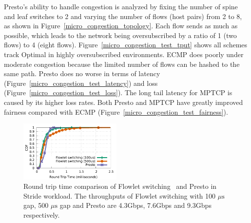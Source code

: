 Presto's ability to handle congestion is analyzed by fixing 
the number of spine and leaf switches to 2 and varying
the number of flows (host pairs) from 2 to 8, as shown
in Figure~\ref{micro_congestion_topology}. 
Each flow sends as much as possible, which leads to the network
being oversubscribed by a ratio of 1 (two flows) to 4 (eight flows).
Figure~\ref{micro_congestion_test_tput} shows all schemes track Optimal in highly
oversubscribed environments. ECMP
does poorly under moderate congestion because the limited number of flows can be hashed to the same path.
Presto does no worse in terms of latency (Figure~\ref{micro_congestion_test_latency}) and loss (Figure~\ref{micro_congestion_test_loss}).
The long tail latency for MPTCP is caused by its higher loss rates.
Both Presto and MPTCP have greatly improved fairness compared with ECMP (Figure~\ref{micro_congestion_test_fairness}).

\begin{figure}[t]
        \centering
  \includegraphics[width=0.45\textwidth]{presto/figures/flowlets/flowlet_switching/flowlet_presto_compare_sockperf.pdf}
        \caption{Round trip time comparison of Flowlet switching~\cite{flowlet,conga} and Presto in Stride workload. 
		The throughputs of Flowlet switching with 100 $\mu\text{s}$ gap, 500 $\mu\text{s}$ gap and Presto 
		are 4.3Gbps, 7.6Gbps and 9.3Gbps respectively. }
        \label{micro_flowlet_rtt_compare}
\end{figure}


